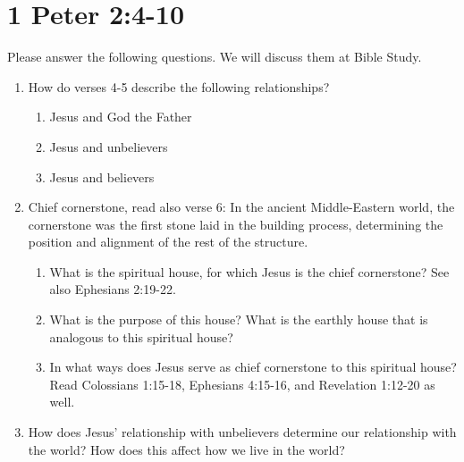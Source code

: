 \documentclass[12pt]{article}
\newcommand{\answerbox}{\vspace{1cm}}
\begin{document}
\part*{1 Peter 2:4-10}
Please answer the following questions.
We will discuss them at Bible Study.
\begin{enumerate}
\section*{The analogy (4-6)}
\item How do verses 4-5 describe the following relationships?
    \begin{enumerate}
    \item Jesus and God the Father
        \answerbox
    \item Jesus and unbelievers
        \answerbox
    \item Jesus and believers
        \answerbox
    \end{enumerate}
\item Chief cornerstone, read also verse 6: In the ancient Middle-Eastern world,
    the cornerstone was the first stone laid in the building process,
    determining the position and alignment of the rest of the structure.
    \begin{enumerate}
    \item What is the spiritual house, for which Jesus is the chief cornerstone?
        See also Ephesians 2:19-22.
        \answerbox
    \item What is the purpose of this house?
        What is the earthly house that is analogous to this spiritual house?
        \answerbox
    \item In what ways does Jesus serve as chief cornerstone 
        to this spiritual house?
        Read Colossians 1:15-18, Ephesians 4:15-16, and Revelation 1:12-20
        as well.
        \answerbox
    \end{enumerate}
\item How does Jesus' relationship with unbelievers determine
        our relationship with the world?
    How does this affect how we live in the world?
        \answerbox


\end{enumerate}
\end{document}
